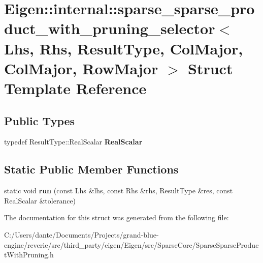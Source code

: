 \hypertarget{struct_eigen_1_1internal_1_1sparse__sparse__product__with__pruning__selector_3_01_lhs_00_01_rhs_21e1c567bb33db704730c4eb2830e598}{}\section{Eigen\+::internal\+::sparse\+\_\+sparse\+\_\+product\+\_\+with\+\_\+pruning\+\_\+selector$<$ Lhs, Rhs, Result\+Type, Col\+Major, Col\+Major, Row\+Major $>$ Struct Template Reference}
\label{struct_eigen_1_1internal_1_1sparse__sparse__product__with__pruning__selector_3_01_lhs_00_01_rhs_21e1c567bb33db704730c4eb2830e598}
\subsection*{Public Types}
\begin{DoxyCompactItemize}
\item 
\mbox{\label{struct_eigen_1_1internal_1_1sparse__sparse__product__with__pruning__selector_3_01_lhs_00_01_rhs_21e1c567bb33db704730c4eb2830e598_ac278b297a10554f7a626bec7b3c0e4ac}} 
typedef Result\+Type\+::\+Real\+Scalar {\bfseries Real\+Scalar}
\end{DoxyCompactItemize}
\subsection*{Static Public Member Functions}
\begin{DoxyCompactItemize}
\item 
\mbox{\label{struct_eigen_1_1internal_1_1sparse__sparse__product__with__pruning__selector_3_01_lhs_00_01_rhs_21e1c567bb33db704730c4eb2830e598_a77924e7e4cd8a2d3bf5dca49ad937ee8}} 
static void {\bfseries run} (const Lhs \&lhs, const Rhs \&rhs, Result\+Type \&res, const Real\+Scalar \&tolerance)
\end{DoxyCompactItemize}


The documentation for this struct was generated from the following file\+:\begin{DoxyCompactItemize}
\item 
C\+:/\+Users/dante/\+Documents/\+Projects/grand-\/blue-\/engine/reverie/src/third\+\_\+party/eigen/\+Eigen/src/\+Sparse\+Core/Sparse\+Sparse\+Product\+With\+Pruning.\+h\end{DoxyCompactItemize}
